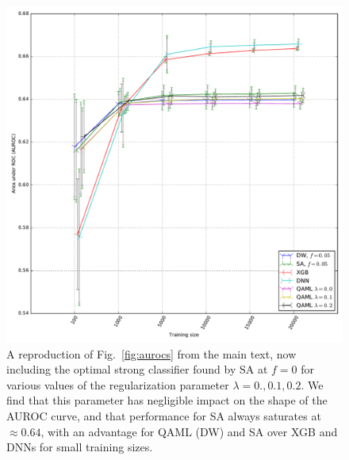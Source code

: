 \begin{figure}[hbb]
 \centering
  \includegraphics[width=0.7\columnwidth]{chapters/Higgs/aucs_lambda}
  \caption{A reproduction of Fig.~\ref{fig:aurocs}
  from the main text, now including the optimal strong classifier found by SA at $f=0$
  for various values of the regularization parameter $\lambda=0.,0.1,0.2$. We find that this parameter has negligible impact on the shape of the AUROC curve, and that performance for SA always saturates at $\approx 0.64$, with an advantage for QAML (DW) and SA over XGB and DNNs for small training sizes.}
  \label{fig:aucs_lambda}
\end{figure}

